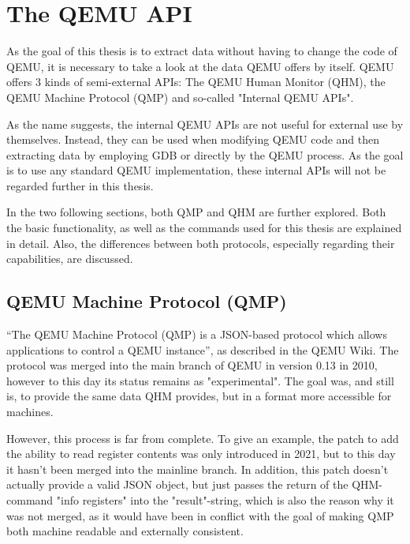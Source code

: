 
\chapter{The QEMU API} \label{chap:QEMU_API}
As the goal of this thesis is to extract data without having to change the code of QEMU,
it is necessary to take a look at the data QEMU offers by itself.
QEMU offers 3 kinds of semi-external APIs: The QEMU Human Monitor (QHM)\cite{qhm-documentation},
the QEMU Machine Protocol (QMP)\cite{qmp-description} and so-called "Internal QEMU APIs"\cite{internal}.

As the name suggests, the internal QEMU APIs are not useful for external use by themselves.
Instead, they can be used when modifying QEMU code and then extracting data by employing GDB or directly by the QEMU process.
As the goal is to use any standard QEMU implementation, these internal APIs will not be regarded further in this thesis.

In the two following sections, both QMP and QHM are further explored. Both the basic functionality,
as well as the commands used for this thesis are explained in detail.
Also, the differences between both protocols, especially regarding their capabilities,
are discussed.

\section{QEMU Machine Protocol (QMP)} \label{sec:QMP}
\enquote{The QEMU Machine Protocol (QMP) is a JSON-based protocol which allows applications to control a QEMU instance}\cite{qmp-description}, as described in the QEMU Wiki.
The protocol was merged into the main branch of QEMU in version 0.13 in 2010, however to this day its status remains as "experimental"\cite{qmp-merge}.
The goal was, and still is, to provide the same data QHM provides, but in a format more accessible for machines.

However, this process is far from complete. To give an example, the patch to add the ability to read register contents was only introduced in 2021,
but to this day it hasn't been merged into the mainline branch.
In addition, this patch doesn't actually provide a valid JSON object, but just passes the return of the QHM-command "info registers" into the "result"-string\cite{qmp-registers-patch},
which is also the reason why it was not merged, as it would have been in conflict with the goal of making QMP both machine readable and externally consistent.

